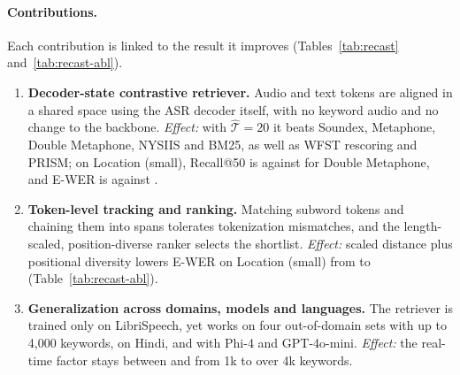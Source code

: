 \paragraph{Contributions.} Each contribution is linked to the result it improves (Tables~\ref{tab:recast} and~\ref{tab:recast-abl}).
\begin{enumerate}
  \item \textbf{Decoder-state contrastive retriever.} Audio and text tokens are aligned in a shared space using the ASR decoder itself, with no keyword audio and no change to the backbone.
    \emph{Effect:} with $\hat{\mathcal{T}}{=}20$ it beats Soundex, Metaphone, Double Metaphone, NYSIIS and BM25, as well as WFST rescoring and PRISM;
    on Location (small), Recall@50 is  against  for Double Metaphone, and E-WER is  against .
  \item \textbf{Token-level tracking and ranking.} Matching subword tokens and chaining them into spans tolerates tokenization mismatches, and the length-scaled, position-diverse ranker selects the shortlist.
    \emph{Effect:} scaled distance plus positional diversity lowers E-WER on Location (small) from  to  (Table~\ref{tab:recast-abl}).
  \item \textbf{Generalization across domains, models and languages.} The retriever is trained only on LibriSpeech, yet works on four out-of-domain sets with up to 4{,}000 keywords,
    on Hindi, and with Phi-4 and GPT-4o-mini.
    \emph{Effect:} the real-time factor stays between  and  from 1k to over 4k keywords.
\end{enumerate}

